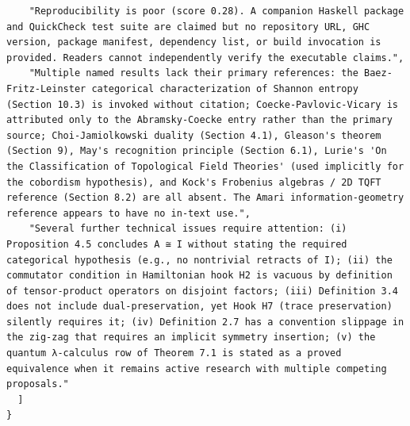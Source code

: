 \documentclass[11pt]{article}
\begin{document}
\begin{verbatim}
    "Reproducibility is poor (score 0.28). A companion Haskell package and QuickCheck test suite are claimed but no repository URL, GHC version, package manifest, dependency list, or build invocation is provided. Readers cannot independently verify the executable claims.",
    "Multiple named results lack their primary references: the Baez-Fritz-Leinster categorical characterization of Shannon entropy (Section 10.3) is invoked without citation; Coecke-Pavlovic-Vicary is attributed only to the Abramsky-Coecke entry rather than the primary source; Choi-Jamiolkowski duality (Section 4.1), Gleason's theorem (Section 9), May's recognition principle (Section 6.1), Lurie's 'On the Classification of Topological Field Theories' (used implicitly for the cobordism hypothesis), and Kock's Frobenius algebras / 2D TQFT reference (Section 8.2) are all absent. The Amari information-geometry reference appears to have no in-text use.",
    "Several further technical issues require attention: (i) Proposition 4.5 concludes A ≅ I without stating the required categorical hypothesis (e.g., no nontrivial retracts of I); (ii) the commutator condition in Hamiltonian hook H2 is vacuous by definition of tensor-product operators on disjoint factors; (iii) Definition 3.4 does not include dual-preservation, yet Hook H7 (trace preservation) silently requires it; (iv) Definition 2.7 has a convention slippage in the zig-zag that requires an implicit symmetry insertion; (v) the quantum λ-calculus row of Theorem 7.1 is stated as a proved equivalence when it remains active research with multiple competing proposals."
  ]
}
\end{verbatim}
\end{document}
